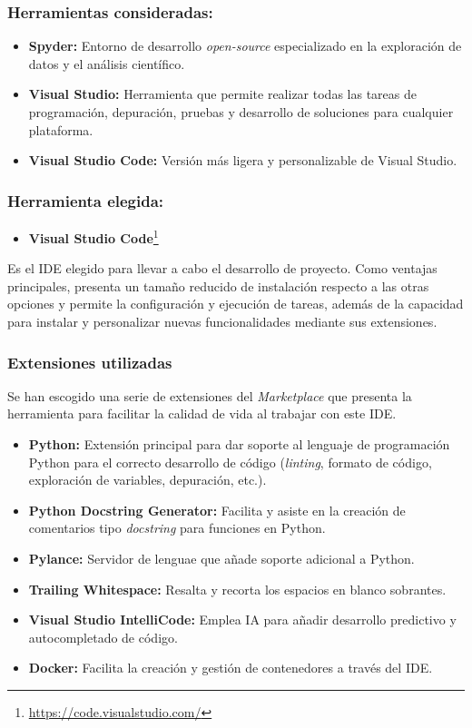 \subsubsection{Herramientas consideradas:}

\begin{itemize}
    \item \textbf{Spyder:} Entorno de desarrollo \textit{open-source} especializado en la exploración de datos y el análisis científico.
    \item \textbf{Visual Studio:} Herramienta que permite realizar todas las tareas de programación, depuración, pruebas y desarrollo de soluciones para cualquier plataforma.
    \item \textbf{Visual Studio Code:} Versión más ligera y personalizable de Visual Studio.
\end{itemize}

\subsubsection{Herramienta elegida:}

\begin{itemize}
    \item \textbf{Visual Studio Code}\footnote{\url{https://code.visualstudio.com/}}
\end{itemize}

Es el IDE elegido para llevar a cabo el desarrollo de proyecto. Como ventajas principales, presenta un tamaño reducido de instalación respecto a las otras opciones y permite la configuración y ejecución de tareas, además de la capacidad para instalar y personalizar nuevas funcionalidades mediante sus extensiones.

\subsubsection{Extensiones utilizadas}

Se han escogido una serie de extensiones del \textit{Marketplace} que presenta la herramienta para facilitar la calidad de vida al trabajar con este IDE.

\begin{itemize}
    \item \textbf{Python:} Extensión principal para dar soporte al lenguaje de programación Python para el correcto desarrollo de código (\textit{linting}, formato de código, exploración de variables, depuración, etc.).
    \item \textbf{Python Docstring Generator:} Facilita y asiste en la creación de comentarios tipo \textit{docstring} para funciones en Python.
    \item \textbf{Pylance:} Servidor de lenguae que añade soporte adicional a Python.
    \item \textbf{Trailing Whitespace:} Resalta y recorta los espacios en blanco sobrantes.
    \item \textbf{Visual Studio IntelliCode:} Emplea IA para añadir desarrollo predictivo y autocompletado de código.
    \item \textbf{Docker:} Facilita la creación y gestión de contenedores a través del IDE.
\end{itemize}

